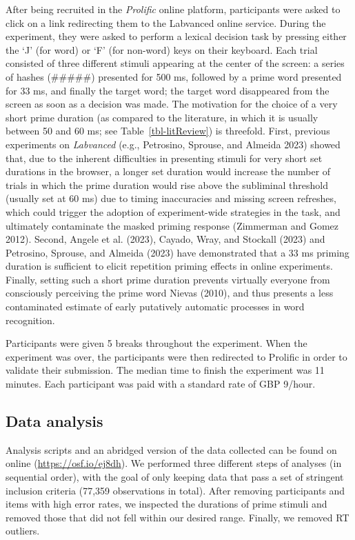 \documentclass[
]{interact}
\begin{document}
After being recruited in the \emph{Prolific} online platform,
participants were asked to click on a link redirecting them to the
Labvanced online service. During the experiment, they were asked to
perform a lexical decision task by pressing either the `J' (for word) or
`F' (for non-word) keys on their keyboard. Each trial consisted of three
different stimuli appearing at the center of the screen: a series of
hashes (\#\#\#\#\#) presented for 500 ms, followed by a prime word
presented for 33 ms, and finally the target word; the target word
disappeared from the screen as soon as a decision was made. The
motivation for the choice of a very short prime duration (as compared to
the literature, in which it is usually between 50 and 60 ms; see
Table~\ref{tbl-litReview}) is threefold. First, previous experiments on
\emph{Labvanced} (e.g., Petrosino, Sprouse, and Almeida 2023) showed
that, due to the inherent difficulties in presenting stimuli for very
short set durations in the browser, a longer set duration would increase
the number of trials in which the prime duration would rise above the
subliminal threshold (usually set at 60 ms) due to timing inaccuracies
and missing screen refreshes, which could trigger the adoption of
experiment-wide strategies in the task, and ultimately contaminate the
masked priming response (Zimmerman and Gomez 2012). Second, Angele et
al. (2023), Cayado, Wray, and Stockall (2023) and Petrosino, Sprouse,
and Almeida (2023) have demonstrated that a 33 ms priming duration is
sufficient to elicit repetition priming effects in online experiments.
Finally, setting such a short prime duration prevents virtually everyone
from consciously perceiving the prime word Nievas (2010), and thus
presents a less contaminated estimate of early putatively automatic
processes in word recognition.

Participants were given 5 breaks throughout the experiment. When the
experiment was over, the participants were then redirected to Prolific
in order to validate their submission. The median time to finish the
experiment was 11 minutes. Each participant was paid with a standard
rate of GBP 9/hour.

\subsection{Data analysis}\label{sec-exp1-analysis}

Analysis scripts and an abridged version of the data collected can be
found on online (\url{https://osf.io/ej8dh}). We performed three
different steps of analyses (in sequential order), with the goal of only
keeping data that pass a set of stringent inclusion criteria (77,359
observations in total). After removing participants and items with high
error rates, we inspected the durations of prime stimuli and removed
those that did not fell within our desired range. Finally, we removed RT
outliers.
\end{document}
